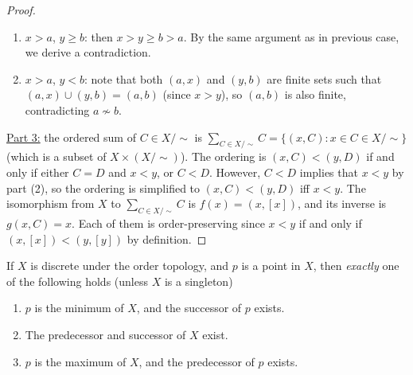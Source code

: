 \documentclass{treatise}
\begin{document}
\begin{proof}
\begin{enumerate}[label = (\alph*)]
\begin{enumerate}[label = \roman*.]
        \item $x > a$, $y \geq b$: then $x > y \geq b > a$. By the same argument as in previous case, we derive a contradiction.
        \item $x > a$, $y < b$: note that both $(a, x)$ and $(y, b)$ are finite sets such that $(a, x) \cup (y, b) = (a, b)$ (since $x > y$), so $(a, b)$ is also finite, contradicting $a \not\sim b$.
    \end{enumerate}
\end{enumerate}
\underline{Part 3:} the ordered sum of $C \in X/\sim$ is $\sum_{C \in X / \sim} C = \{ (x, C) : x \in C \in X / \sim \}$ (which is a subset of $X \times (X / \sim)$). The ordering is $(x, C) < (y, D)$ if and only if either $C = D$ and $x < y$, or $C < D$. However, $C < D$ implies that $x < y$ by part (2), so the ordering is simplified to $(x, C) < (y, D)$ iff $x < y$. The isomorphism from $X$ to $\sum_{C \in X / \sim} C$ is $f(x) = (x, [x])$, and its inverse is $g(x, C) = x$. Each of them is order-preserving since $x < y$ if and only if $(x, [x]) < (y, [y])$ by definition.
\end{proof}
\begin{lemma} \label{ord-pred-succ-disc}
If $X$ is discrete under the order topology, and $p$ is a point in $X$, then \textit{exactly} one of the following holds (unless $X$ is a singleton)
\begin{enumerate}
    \item $p$ is the minimum of $X$, and the successor of $p$ exists.
    \item The predecessor and successor of $X$ exist.
    \item $p$ is the maximum of $X$, and the predecessor of $p$ exists.
\end{enumerate}
\end{lemma}
\end{document}
